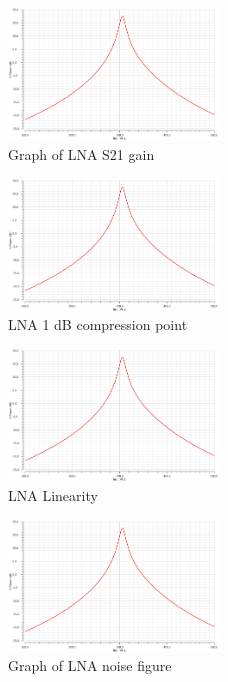 \begin{figure}[h]
   \centering
    \includegraphics[width=0.5\textwidth]{figures/s21.png}
    \caption{Graph of LNA S21 gain}
    \label{fig:s21}
\end{figure}

\begin{figure}[h]
   \centering
    \includegraphics[width=0.5\textwidth]{figures/s21.png}
    \caption{LNA 1 dB compression point}
    \label{fig:1db}
\end{figure}

\begin{figure}[h]
   \centering
    \includegraphics[width=0.5\textwidth]{figures/s21.png}
    \caption{LNA Linearity}
    \label{fig:lnaiip3}
\end{figure}

\begin{figure}[h]
   \centering
    \includegraphics[width=0.5\textwidth]{figures/s21.png}
    \caption{Graph of LNA noise figure}
    \label{fig:lnanoise}
\end{figure}

